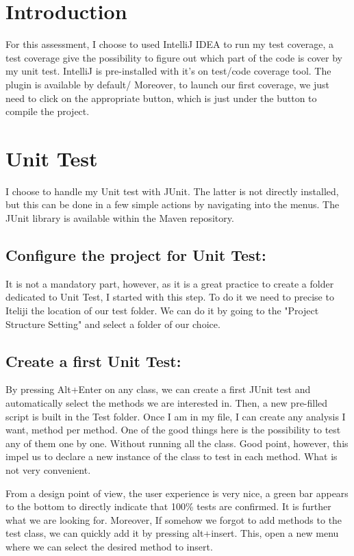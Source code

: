 
\section{Introduction}

For this assessment, I choose to used IntelliJ IDEA to run my test coverage, a test coverage give the possibility to figure out which part of the code is cover by my unit test. IntelliJ is pre-installed with it's on test/code coverage tool. The plugin is available by default/ Moreover, to launch our first coverage, we just need to click on the appropriate button, which is just under the button to compile the project.

\section{Unit Test}

I choose to handle my Unit test with JUnit. The latter is not directly installed, but this can be done in a few simple actions by navigating into the menus. The JUnit library is available within the Maven repository.


\subsection{Configure the project for Unit Test:}


It is not a mandatory part, however, as it is a great practice to create a folder dedicated to Unit Test, I started with this step. To do it we need to precise to Iteliji the location of our test folder. We can do it by going to the "Project Structure Setting" and select a folder of our choice.

\subsection{Create a first Unit Test:}

By pressing Alt+Enter on any class, we can create a first JUnit test and automatically select the methods we are interested in. Then, a new pre-filled script is built in the Test folder. Once I am in my file, I can create any analysis I want, method per method. One of the good things here is the possibility to test any of them one by one. Without running all the class. Good point, however, this impel us to declare a new instance of the class to test in each method. What is not very convenient.

From a design point of view, the user experience is very nice, a green bar appears to the bottom to directly indicate that 100\% tests are confirmed. It is further what we are looking for. Moreover, If somehow we forgot to add methods to the test class, we can quickly add it by pressing alt+insert. This, open a new menu where we can select the desired method to insert.

